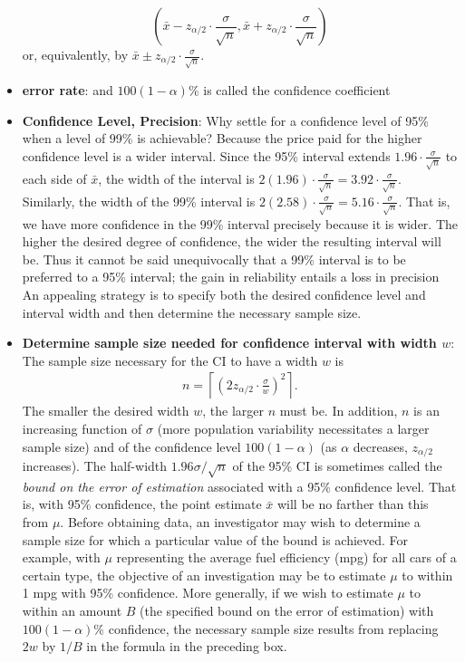 \documentclass{report}
\begin{document}
\begin{itemize}
            \[
                \left( \bar{x} - z_{\alpha/2} \cdot \frac{\sigma}{\sqrt{n}}, \bar{x} + z_{\alpha/2} \cdot \frac{\sigma}{\sqrt{n}} \right)
            \]
            or, equivalently, by \(\bar{x} \pm z_{\alpha/2} \cdot \frac{\sigma}{\sqrt{n}}\).
        \item \textbf{error rate}: and $100(1-\alpha)\%$ is called the confidence coefficient
        \item \textbf{Confidence Level, Precision}: 
            Why settle for a confidence level of 95\% when a level of 99\% is achievable? Because the price paid for the higher confidence level is a wider interval. Since the 95\% interval extends $1.96 \cdot \frac{\sigma}{\sqrt{n}}$ to each side of $\bar{x}$, the width of the interval is $2(1.96) \cdot \frac{\sigma}{\sqrt{n}} = 3.92 \cdot \frac{\sigma}{\sqrt{n}}$. Similarly, the width of the 99\% interval is $2(2.58) \cdot \frac{\sigma}{\sqrt{n}} = 5.16 \cdot \frac{\sigma}{\sqrt{n}}$. That is, we have more confidence in the 99\% interval precisely because it is wider. The higher the desired degree of confidence, the wider the resulting interval will be.
            \bigbreak \noindent 
            Thus it cannot be said unequivocally that a 99\% interval is to be preferred to a 95\% interval; the gain in reliability entails a loss in precision
            \bigbreak \noindent 
            An appealing strategy is to specify both the desired confidence level and interval width and then determine the necessary sample size.
        \item \textbf{Determine sample size needed for confidence interval with width $w$}:
            The sample size necessary for the CI to have a width $w$ is
            \begin{align*}
                n = \left\lceil\left( 2z_{\alpha/2} \cdot \frac{\sigma}{w} \right)^2\right\rceil
            .\end{align*}
            \bigbreak \noindent 
            The smaller the desired width $w$, the larger $n$ must be. In addition, $n$ is an increasing function of $\sigma$ (more population variability necessitates a larger sample size) and of the confidence level $100(1 - \alpha)$ (as $\alpha$ decreases, $z_{\alpha/2}$ increases).
            \bigbreak \noindent 
            The half-width $1.96 \sigma / \sqrt{n}$ of the 95\% CI is sometimes called the \textit{bound on the error of estimation} associated with a 95\% confidence level. That is, with 95\% confidence, the point estimate $\bar{x}$ will be no farther than this from $\mu$. Before obtaining data, an investigator may wish to determine a sample size for which a particular value of the bound is achieved. For example, with $\mu$ representing the average fuel efficiency (mpg) for all cars of a certain type, the objective of an investigation may be to estimate $\mu$ to within 1 mpg with 95\% confidence. More generally, if we wish to estimate $\mu$ to within an amount $B$ (the specified bound on the error of estimation) with $100(1 - \alpha)\%$ confidence, the necessary sample size results from replacing $2w$ by $1/B$ in the formula in the preceding box.

\end{itemize}
\end{document}
